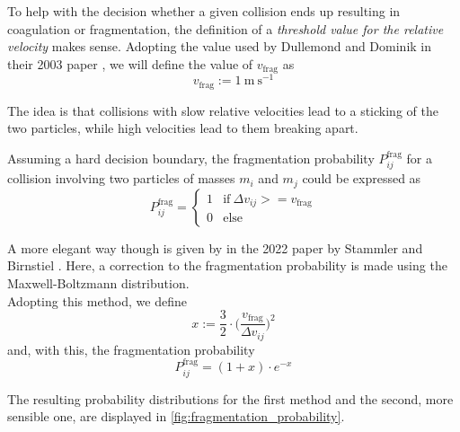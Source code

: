         To help with the decision whether a given collision ends up resulting in coagulation or
        fragmentation, the definition of a \textit{threshold value for the relative velocity} makes 
        sense. Adopting the value used by Dullemond and Dominik in their 2003 paper 
        \cite{dullemond_dominik_2023}, we will define the value of $v_\text{frag}$ as
        \begin{equation}
            v_\text{frag} := \SI{1}{\meter~\second^{-1}}
        \end{equation}

        The idea is that collisions with slow relative velocities lead to a sticking of the two 
        particles, while high velocities lead to them breaking apart. \\

        
        \clearpage

        Assuming a hard decision boundary, the fragmentation probability $P^\text{frag}_{ij}$ 
        for a collision involving two particles of masses $m_i$ and $m_j$ could be expressed as
        \begin{equation}
            P^\text{frag}_{ij}
            =
            \begin{cases}
                1 & \text{if}\ \Delta v_{ij} >= v_\text{frag}\\
                0 & \text{else}
            \end{cases}
        \end{equation}

        A more elegant way though is given by in the 2022 paper by Stammler and Birnstiel 
        \cite{stammler_birnstiel_2022}. Here, a correction to the fragmentation probability is 
        made using the Maxwell-Boltzmann distribution. \\

        Adopting this method, we define
        \begin{equation}
            x:=\frac{3}{2}\cdot\bigg(
                \frac{v_\text{frag}}{\Delta v_{ij}}
            \bigg)^2
        \end{equation}
        and, with this, the fragmentation probability 
        \begin{equation}
            P^\text{frag}_{ij}=(1+x)\cdot e^{-x}
        \end{equation}

        The resulting probability distributions for the first method and the second, more sensible 
        one, are displayed in \cref{fig:fragmentation_probability}.

